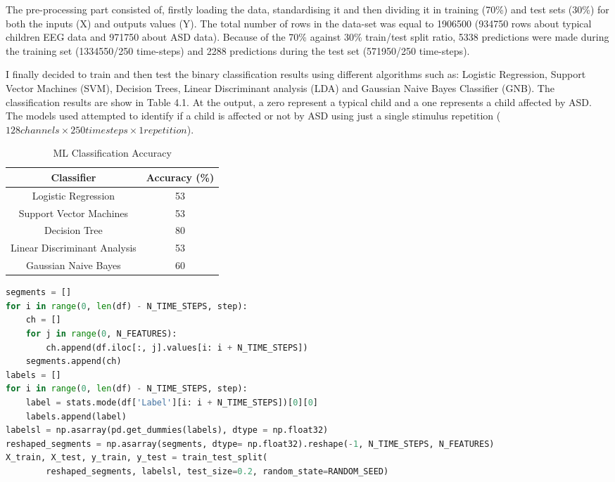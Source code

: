 The pre-processing part consisted of, firstly loading the data, standardising it and then dividing it in training (70\%) and test sets (30\%) for both the inputs (X) and outputs values (Y). The total number of rows in the data-set was equal to 1906500 (934750 rows about typical children EEG data and 971750 about ASD data). Because of the 70\% against 30\% train/test split ratio, 5338 predictions were made during the training set (1334550/250 time-steps) and 2288 predictions during the test set (571950/250 time-steps).

I finally decided to train and then test the binary classification results using different algorithms such as: Logistic Regression, Support Vector Machines (SVM), Decision Trees, Linear Discriminant analysis (LDA) and Gaussian Naive Bayes Classifier (GNB). The classification results are show in Table 4.1. At the output, a zero represent a typical child and a one represents a child affected by ASD. The models used attempted to identify if a child is affected or not by ASD using just a single stimulus repetition ($128 channels \times250 timesteps \times1 repetition$).

{
\begin{table}[h!]
\centering
\begin{tabular}{|c|c|}
\hline
Classifier &Accuracy (\%) \\
\hline
Logistic Regression & 53  \\
Support Vector Machines & 53  \\
Decision Tree & 80  \\
Linear Discriminant Analysis & 53 \\
Gaussian Naive Bayes & 60 \\
\hline
\end{tabular}
\caption{ML Classification Accuracy}
\label{table:1}
\end{table}
}

\begin{lstlisting}[language=Python, caption=LSTM Preprocessing]
segments = []
for i in range(0, len(df) - N_TIME_STEPS, step):
    ch = []
    for j in range(0, N_FEATURES):
        ch.append(df.iloc[:, j].values[i: i + N_TIME_STEPS])
    segments.append(ch)
labels = []
for i in range(0, len(df) - N_TIME_STEPS, step):
    label = stats.mode(df['Label'][i: i + N_TIME_STEPS])[0][0]
    labels.append(label)
labelsl = np.asarray(pd.get_dummies(labels), dtype = np.float32)
reshaped_segments = np.asarray(segments, dtype= np.float32).reshape(-1, N_TIME_STEPS, N_FEATURES)
X_train, X_test, y_train, y_test = train_test_split(
        reshaped_segments, labelsl, test_size=0.2, random_state=RANDOM_SEED)
\end{lstlisting}

